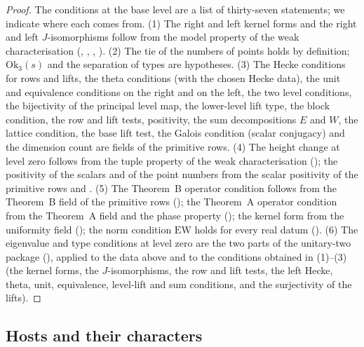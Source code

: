 \begin{proof}
The conditions at the base level are a list of thirty-seven statements; we indicate where each comes from.
(1) The right and left kernel forms and the right and left $J$-isomorphisms follow from the model property of the weak
characterisation (,
, ,
).
(2) The tie of the numbers of points holds by definition; $\mathrm{Ok}_3(s)$ and the separation of types are hypotheses.
(3) The Hecke conditions for rows and lifts, the theta conditions (with the chosen Hecke data), the unit and equivalence
conditions on the right and on the left, the two level conditions, the bijectivity of the principal level map, the
lower-level lift type, the block condition, the row and lift tests, positivity, the sum decompositions $E$ and $W$, the
lattice condition, the base lift test, the Galois condition (scalar conjugacy) and the dimension count are fields of the
primitive rows.
(4) The height change at level zero follows from the tuple property of the weak characterisation
(); the positivity of the scalars and of the point numbers from
the scalar positivity of the primitive rows and .
(5) The Theorem~B operator condition follows from the Theorem~B field of the primitive rows
(); the Theorem~A operator condition from the Theorem~A field and the phase
property (); the kernel form from the uniformity field
(); the norm condition $\mathrm{EW}$ holds for every real datum
().
(6) The eigenvalue and type conditions at level zero are the two parts of the unitary-two package
(), applied to the data above and to the conditions obtained in (1)--(3) (the
kernel forms, the $J$-isomorphisms, the row and lift tests, the left Hecke, theta, unit, equivalence, level-lift and sum
conditions, and the surjectivity of the lifts).
\end{proof}

\subsection{Hosts and their characters}\label{sec:pf:sh-misc:hosts}

